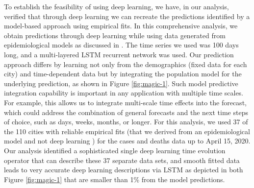 \documentclass[letterpaper, inpress]{jds} %
\renewcommand{\_}{%
    \textunderscore\hspace{0pt}%
}
\begin{document}
To establish the feasibility of using deep learning, we have, in our
analysis, verified that through deep learning we can recreate the
predictions identified by a model-based approach using empirical
fits. In this comprehensive analysis, we obtain predictions through
deep learning while using data generated from epidemiological models
as discussed in \citep{marsland20-covid-paper}. The time series we used
was 100 days long, and a multi-layered LSTM
recurrent network was used. Our prediction approach differs by
learning not only from the demographics (fixed data for each city) and
time-dependent data but by integrating the population model for the
underlying prediction, as shown in Figure \ref{fig:magic-1}. Such model
predictive integration capability is important in any application with
multiple time scales. For example, this allows us to integrate
multi-scale time effects into the forecast, which could address the
combination of general forecasts and the next time steps of choice,
such as days, weeks, months, or longer. For this analysis, we used 37
of the 110 cities with reliable empirical fits (that we derived from
an epidemiological model and not deep learning
\citep{marsland20-covid-paper}) for the cases and deaths data up to
April 15, 2020. Our analysis identified a sophisticated single deep
learning time evolution operator that can describe these 37 separate
data sets, and smooth fitted data leads to very accurate deep learning
descriptions via LSTM as depicted in both Figure \ref{fig:magic-1}
that are smaller than 1\% from the model predictions.
\end{document}
